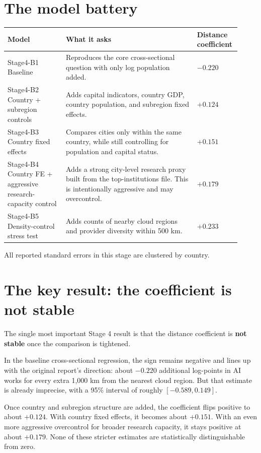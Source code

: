 \documentclass[11pt]{article}
\begin{document}
\section{The model battery}
\begin{longtable}{>{\raggedright\arraybackslash}p{0.24\linewidth} >{\raggedright\arraybackslash}p{0.54\linewidth} >{\raggedright\arraybackslash}p{0.14\linewidth}}
\toprule
\textbf{Model} & \textbf{What it asks} & \textbf{Distance coefficient} \\
\midrule
Stage4-B1 Baseline & Reproduces the core cross-sectional question with only log population added. & $-0.220$ \\
Stage4-B2 Country + subregion controls & Adds capital indicators, country GDP, country population, and subregion fixed effects. & $+0.124$ \\
Stage4-B3 Country fixed effects & Compares cities only within the same country, while still controlling for population and capital status. & $+0.151$ \\
Stage4-B4 Country FE + aggressive research-capacity control & Adds a strong city-level research proxy built from the top-institutions file. This is intentionally aggressive and may overcontrol. & $+0.179$ \\
Stage4-B5 Density-control stress test & Adds counts of nearby cloud regions and provider diversity within 500 km. & $+0.233$ \\
\bottomrule
\end{longtable}

All reported standard errors in this stage are clustered by country.

\section{The key result: the coefficient is not stable}
The single most important Stage 4 result is that the distance coefficient is \textbf{not stable} once the comparison is tightened.

In the baseline cross-sectional regression, the sign remains negative and lines up with the original report's direction: about $-0.220$ additional log-points in AI works for every extra 1{,}000 km from the nearest cloud region. But that estimate is already imprecise, with a 95\% interval of roughly $[-0.589, 0.149]$.

Once country and subregion structure are added, the coefficient flips positive to about $+0.124$. With country fixed effects, it becomes about $+0.151$. With an even more aggressive overcontrol for broader research capacity, it stays positive at about $+0.179$. None of these stricter estimates are statistically distinguishable from zero.
\end{document}
